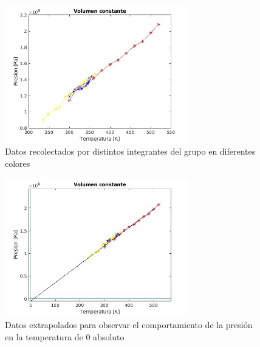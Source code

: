\documentclass[journal,transmag]{IEEEtran}
\begin{document}
\begin{figure}[!h]
				\center
				\includegraphics[width=8cm]{img/volcte1.jpg}
				\caption{Datos recolectados por distintos integrantes del grupo en diferentes colores}
				\label{f13}
	\end{figure}
	\begin{figure}[!h]
				\center
				\includegraphics[width=8cm]{img/volcte2.jpg}
				\caption{Datos extrapolados para observar el comportamiento de la presión en la temperatura de 0 absoluto}
				\label{f14}
	\end{figure}
\end{document}
